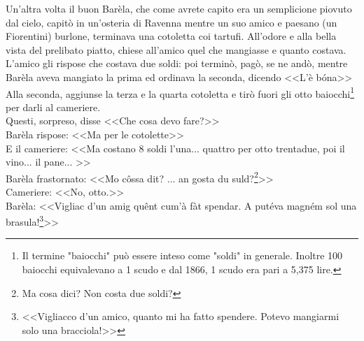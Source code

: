Un'altra volta il buon Barèla, che come avrete capito era un semplicione piovuto dal cielo, capitò in un'osteria di Ravenna mentre un suo amico e paesano (un Fiorentini) burlone, terminava una cotoletta coi tartufi. All'odore e alla bella vista del prelibato piatto, chiese all'amico quel che mangiasse e quanto costava. L'amico gli rispose che costava due soldi: poi terminò, pagò, se ne andò, mentre Barèla aveva mangiato la prima ed ordinava la seconda, dicendo <<L'è bóna>>\\
Alla seconda, aggiunse la terza e la quarta cotoletta e tirò fuori gli otto baiocchi\footnote{Il termine "baiocchi" può essere inteso come "soldi" in generale. Inoltre 100 baiocchi equivalevano a 1 scudo e dal 1866, 1 scudo era pari a 5,375 lire.} per darli al cameriere.\\
\indent Questi, sorpreso, disse <<Che cosa devo fare?>>\\
\indent {}Barèla rispose: <<Ma per le cotolette>>\\
\indent E il cameriere: <<Ma costano 8 soldi l'una... quattro per otto trentadue, poi il vino... il pane... >>\\
\indent {}Barèla frastornato: <<Mo côssa dit? ... an gosta du suld?\footnote{Ma cosa dici? Non costa due soldi?}>>\\
\indent Cameriere: <<No, otto.>>\\
\indent {}Barèla: <<Vigliac d'un amig quênt cum'à fàt spendar. A putéva magném sol una brasula!\footnote{<<Vigliacco d'un amico, quanto mi ha fatto spendere. Potevo mangiarmi solo una bracciola!>>}>>











































